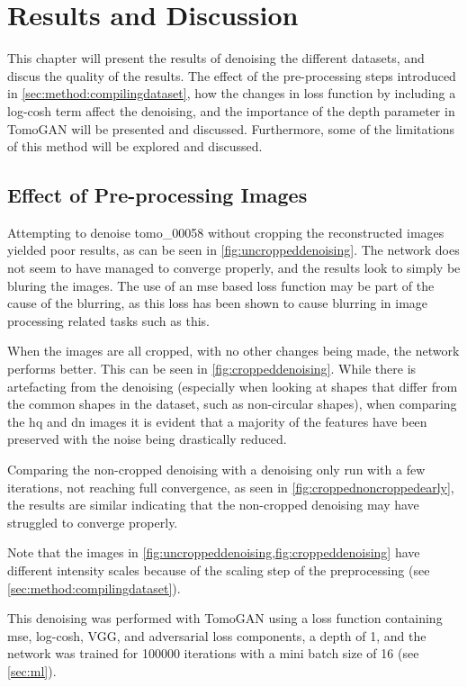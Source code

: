\chapter{Results and Discussion}
\label{sec:results}
This chapter will present the results of denoising the different datasets, and discus the quality of the results. The effect of the pre-processing steps introduced in \cref{sec:method:compilingdataset}, how the changes in loss function by including a log-cosh term affect the denoising, and the importance of the depth parameter in TomoGAN will be presented and discussed. Furthermore, some of the limitations of this method will be explored and discussed. 

\section{Effect of Pre-processing Images}
Attempting to denoise tomo\_00058 without cropping the reconstructed images yielded poor results, as can be seen in \cref{fig:uncroppeddenoising}. The network does not seem to have managed to converge properly, and the results look to simply be bluring the images. The use of an \gls{mse} based loss function may be part of the cause of the blurring, as this loss has been shown to cause blurring in image processing related tasks such as this. 

When the images are all cropped, with no other changes being made, the network performs better. This can be seen in \cref{fig:croppeddenoising}. While there is artefacting from the denoising (especially when looking at shapes that differ from the common shapes in the dataset, such as non-circular shapes), when comparing the \gls{hq} and \gls{dn} images it is evident that a majority of the features have been preserved with the noise being drastically reduced. 

Comparing the non-cropped denoising with a denoising only run with a few iterations, not reaching full convergence, as seen in \cref{fig:croppednoncroppedearly}, the results are similar indicating that the non-cropped denoising may have struggled to converge properly. 

Note that the images in \cref{fig:uncroppeddenoising,fig:croppeddenoising} have different intensity scales because of the scaling step of the preprocessing (see \cref{sec:method:compilingdataset}). 

This denoising was performed with TomoGAN using a loss function containing \gls{mse}, log-cosh, VGG, and adversarial loss components, a depth of 1, and the network was trained for 100000 iterations with a mini batch size of 16 (see \cref{sec:ml}). 


